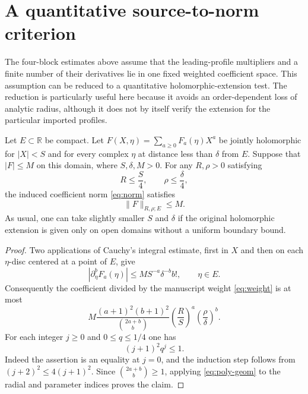 \section{A quantitative source-to-norm criterion}
\label{sec:cauchy-bridge}
The four-block estimates above assume that the leading-profile multipliers and a finite number of their derivatives lie in one fixed weighted coefficient space. This assumption can be reduced to a quantitative holomorphic-extension test. The reduction is particularly useful here because it avoids an order-dependent loss of analytic radius, although it does not by itself verify the extension for the particular imported profiles.

\begin{theorem}
\label{thm:cauchy-embed}
Let $E\subset\mathbb R$ be compact. Let
\(F(X,\eta)=\sum_{a\ge0}F_a(\eta)X^a\) be jointly holomorphic for $|X|<S$ and for every complex $\eta$ at distance less than $\delta$ from $E$. Suppose that $|F|\le M$ on this domain, where $S,\delta,M>0$. For any $R,\rho>0$ satisfying
\[
    R\le \frac S4,\qquad \rho\le \frac\delta4,
\]
the induced coefficient norm \eqref{eq:norm} satisfies
\[
                         \|F\|_{R,\rho;E}\le M.
\]
As usual, one can take slightly smaller $S$ and $\delta$ if the original holomorphic extension is given only on open domains without a uniform boundary bound.
\end{theorem}
\begin{proof}
Two applications of Cauchy's integral estimate, first in $X$ and then on each $\eta$-disc centered at a point of $E$, give
\[
    |\partial_\eta^bF_a(\eta)|\le M S^{-a}\delta^{-b}b!,
    \qquad \eta\in E.
\]
Consequently the coefficient divided by the manuscript weight \eqref{eq:weight} is at most
\[
 M\frac{(a+1)^2(b+1)^2}{\binom{2a+b}{b}}
     \left(\frac R S\right)^a
     \left(\frac\rho\delta\right)^b.
\]
For each integer $j\ge0$ and $0\le q\le1/4$ one has
\begin{equation}\label{eq:poly-geom}
                         (j+1)^2q^j\le1.
\end{equation}
Indeed the assertion is an equality at $j=0$, and the induction step follows from $(j+2)^2\le4(j+1)^2$. Since $\binom{2a+b}{b}\ge1$, applying \eqref{eq:poly-geom} to the radial and parameter indices proves the claim.
\end{proof}

